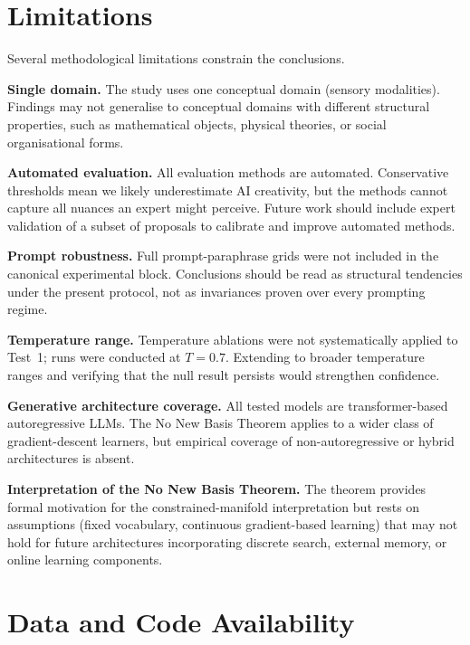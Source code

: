 \documentclass[pdflatex,sn-mathphys-num]{sn-jnl}
\begin{document}
\section{Limitations}
\label{sec:limits}

Several methodological limitations constrain the conclusions.

\textbf{Single domain.}  The study uses one conceptual domain (sensory modalities).  Findings
may not generalise to conceptual domains with different structural properties, such as
mathematical objects, physical theories, or social organisational forms.

\textbf{Automated evaluation.}  All evaluation methods are automated.  Conservative thresholds
mean we likely underestimate AI creativity, but the methods cannot capture all nuances an expert
might perceive.  Future work should include expert validation of a subset of proposals to
calibrate and improve automated methods.

\textbf{Prompt robustness.}  Full prompt-paraphrase grids were not included in the canonical
experimental block.  Conclusions should be read as structural tendencies under the present
protocol, not as invariances proven over every prompting regime.

\textbf{Temperature range.}  Temperature ablations were not systematically applied to Test~1;
runs were conducted at $T=0.7$.  Extending to broader temperature ranges and verifying that the
null result persists would strengthen confidence.

\textbf{Generative architecture coverage.}  All tested models are transformer-based
autoregressive LLMs.  The No New Basis Theorem applies to a wider class of gradient-descent
learners, but empirical coverage of non-autoregressive or hybrid architectures is absent.

\textbf{Interpretation of the No New Basis Theorem.}  The theorem provides formal motivation
for the constrained-manifold interpretation but rests on assumptions (fixed vocabulary,
continuous gradient-based learning) that may not hold for future architectures incorporating
discrete search, external memory, or online learning components.

\section{Data and Code Availability}
\label{sec:data}
\end{document}
